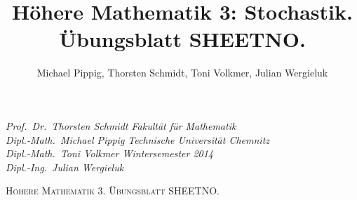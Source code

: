 \documentclass[11pt,a4paper,oldfontcommands,onecolumn]{memoir}
\title{Höhere Mathematik 3: Stochastik. Übungsblatt SHEETNO.}
\author{Michael Pippig, Thorsten Schmidt, Toni Volkmer, Julian Wergieluk}\date{}
\begin{document}
\pagestyle{empty}

{\itshape\small
Prof.\ Dr.\ Thorsten Schmidt \hfill Fakultät für Mathematik \\
Dipl.-Math.\ Michael Pippig \hfill Technische Universität Chemnitz \\
Dipl.-Math.\ Toni Volkmer \hfill Wintersemester 2014 \\
Dipl.-Ing.\ Julian Wergieluk
}


\begin{center}
    {\LARGE\scshape Höhere Mathematik 3. Übungsblatt SHEETNO. \\}
\end{center}

\pagestyle{plain}
\sloppy
\end{document}
